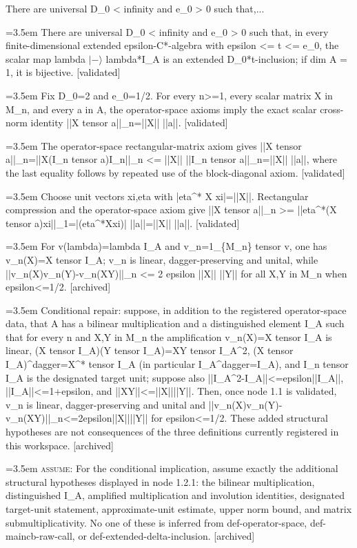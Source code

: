 \documentclass{article}
\newcommand{\step}[1]{\par\noindent\hangindent=3.5em\hangafter=1%
  \makebox[3.5em][l]{\textbf{#1.}}}
\newcommand{\steptag}[1]{\hfill{\small\textsf{[#1]}}}
\begin{document}
\begin{proofbox}{There are universal D\_0 < infinity and e\_0 > 0 such that,...}
\step{1} There are universal D\_0 < infinity and e\_0 > 0 such that, in every finite-dimensional extended epsilon-C*-algebra with epsilon <= t <= e\_0, the scalar map lambda $|-\rangle$ lambda*I\_A is an extended D\_0*t-inclusion; if dim A = 1, it is bijective. \steptag{validated} \\[6pt]
\step{1.1} Fix D\_0=2 and e\_0=1/2. For every n>=1, every scalar matrix X in M\_n, and every a in A, the operator-space axioms imply the exact scalar cross-norm identity ||X tensor a||\_n=||X|| ||a||. \steptag{validated} \\[6pt]
\step{1.1.1} The operator-space rectangular-matrix axiom gives ||X tensor a||\_n=||X(I\_n tensor a)I\_n||\_n <= ||X|| ||I\_n tensor a||\_n=||X|| ||a||, where the last equality follows by repeated use of the block-diagonal axiom. \steptag{validated} \\[4pt]
\step{1.1.2} Choose unit vectors xi,eta with |eta\textasciicircum{}* X xi|=||X||. Rectangular compression and the operator-space axiom give ||X tensor a||\_n >= ||eta\textasciicircum{}*(X tensor a)xi||\_1=|(eta\textasciicircum{}*Xxi)| ||a||=||X|| ||a||. \steptag{validated} \\[4pt]
\step{1.2} For v(lambda)=lambda I\_A and v\_n=1\_\{M\_n\} tensor v, one has v\_n(X)=X tensor I\_A; v\_n is linear, dagger-preserving and unital, while ||v\_n(X)v\_n(Y)-v\_n(XY)||\_n <= 2 epsilon ||X|| ||Y|| for all X,Y in M\_n when epsilon<=1/2. \steptag{archived} \\[6pt]
\step{1.2.1} Conditional repair: suppose, in addition to the registered operator-space data, that A has a bilinear multiplication and a distinguished element I\_A such that for every n and X,Y in M\_n the amplification v\_n(X)=X tensor I\_A is linear, (X tensor I\_A)(Y tensor I\_A)=XY tensor I\_A\textasciicircum{}2, (X tensor I\_A)\textasciicircum{}dagger=X\textasciicircum{}* tensor I\_A (in particular I\_A\textasciicircum{}dagger=I\_A), and I\_n tensor I\_A is the designated target unit; suppose also ||I\_A\textasciicircum{}2-I\_A||<=epsilon||I\_A||, ||I\_A||<=1+epsilon, and ||XY||<=||X||||Y||. Then, once node 1.1 is validated, v\_n is linear, dagger-preserving and unital and ||v\_n(X)v\_n(Y)-v\_n(XY)||\_n<=2epsilon||X||||Y|| for epsilon<=1/2. These added structural hypotheses are not consequences of the three definitions currently registered in this workspace. \steptag{archived} \\[6pt]
\step{1.2.1.1} \textsc{assume}: For the conditional implication, assume exactly the additional structural hypotheses displayed in node 1.2.1: the bilinear multiplication, distinguished I\_A, amplified multiplication and involution identities, designated target-unit statement, approximate-unit estimate, upper norm bound, and matrix submultiplicativity. No one of these is inferred from def-operator-space, def-maincb-raw-call, or def-extended-delta-inclusion. \steptag{archived} \\[4pt]

\end{proofbox}
\end{document}
